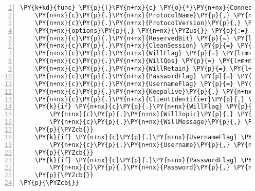 \begin{Verbatim}[commandchars=\\\{\},numbers=left,firstnumber=1,stepnumber=1,frame=single]
\PY{k+kd}{func} \PY{p}{(}\PY{n+nx}{c} \PY{o}{*}\PY{n+nx}{ConnectPacket}\PY{p}{)} \PY{n+nx}{Unpack}\PY{p}{(}\PY{n+nx}{b} \PY{n+nx}{io}\PY{p}{.}\PY{n+nx}{Reader}\PY{p}{)} \PY{p}{\PYZob{}}
	\PY{n+nx}{c}\PY{p}{.}\PY{n+nx}{ProtocolName}\PY{p}{,} \PY{n+nx}{\PYZus{}} \PY{p}{=} \PY{n+nx}{decodeString}\PY{p}{(}\PY{n+nx}{b}\PY{p}{)}
	\PY{n+nx}{c}\PY{p}{.}\PY{n+nx}{ProtocolVersion}\PY{p}{,} \PY{n+nx}{\PYZus{}} \PY{p}{=} \PY{n+nx}{decodeByte}\PY{p}{(}\PY{n+nx}{b}\PY{p}{)}
	\PY{n+nx}{options}\PY{p}{,} \PY{n+nx}{\PYZus{}} \PY{o}{:=} \PY{n+nx}{decodeByte}\PY{p}{(}\PY{n+nx}{b}\PY{p}{)}
	\PY{n+nx}{c}\PY{p}{.}\PY{n+nx}{ReservedBit} \PY{p}{=} \PY{l+m+mi}{1} \PY{o}{\PYZam{}} \PY{n+nx}{options}
	\PY{n+nx}{c}\PY{p}{.}\PY{n+nx}{CleanSession} \PY{p}{=} \PY{l+m+mi}{1} \PY{o}{\PYZam{}} \PY{p}{(}\PY{n+nx}{options} \PY{o}{\PYZgt{}\PYZgt{}} \PY{l+m+mi}{1}\PY{p}{)} \PY{p}{\PYZgt{}} \PY{l+m+mi}{0}
	\PY{n+nx}{c}\PY{p}{.}\PY{n+nx}{WillFlag} \PY{p}{=} \PY{l+m+mi}{1} \PY{o}{\PYZam{}} \PY{p}{(}\PY{n+nx}{options} \PY{o}{\PYZgt{}\PYZgt{}} \PY{l+m+mi}{2}\PY{p}{)} \PY{p}{\PYZgt{}} \PY{l+m+mi}{0}
	\PY{n+nx}{c}\PY{p}{.}\PY{n+nx}{WillQos} \PY{p}{=} \PY{l+m+mi}{3} \PY{o}{\PYZam{}} \PY{p}{(}\PY{n+nx}{options} \PY{o}{\PYZgt{}\PYZgt{}} \PY{l+m+mi}{3}\PY{p}{)}
	\PY{n+nx}{c}\PY{p}{.}\PY{n+nx}{WillRetain} \PY{p}{=} \PY{l+m+mi}{1} \PY{o}{\PYZam{}} \PY{p}{(}\PY{n+nx}{options} \PY{o}{\PYZgt{}\PYZgt{}} \PY{l+m+mi}{5}\PY{p}{)} \PY{p}{\PYZgt{}} \PY{l+m+mi}{0}
	\PY{n+nx}{c}\PY{p}{.}\PY{n+nx}{PasswordFlag} \PY{p}{=} \PY{l+m+mi}{1} \PY{o}{\PYZam{}} \PY{p}{(}\PY{n+nx}{options} \PY{o}{\PYZgt{}\PYZgt{}} \PY{l+m+mi}{6}\PY{p}{)} \PY{p}{\PYZgt{}} \PY{l+m+mi}{0}
	\PY{n+nx}{c}\PY{p}{.}\PY{n+nx}{UsernameFlag} \PY{p}{=} \PY{l+m+mi}{1} \PY{o}{\PYZam{}} \PY{p}{(}\PY{n+nx}{options} \PY{o}{\PYZgt{}\PYZgt{}} \PY{l+m+mi}{7}\PY{p}{)} \PY{p}{\PYZgt{}} \PY{l+m+mi}{0}
	\PY{n+nx}{c}\PY{p}{.}\PY{n+nx}{Keepalive}\PY{p}{,} \PY{n+nx}{\PYZus{}} \PY{p}{=} \PY{n+nx}{decodeUint16}\PY{p}{(}\PY{n+nx}{b}\PY{p}{)}
	\PY{n+nx}{c}\PY{p}{.}\PY{n+nx}{ClientIdentifier}\PY{p}{,} \PY{n+nx}{\PYZus{}} \PY{p}{=} \PY{n+nx}{decodeString}\PY{p}{(}\PY{n+nx}{b}\PY{p}{)}
	\PY{k}{if} \PY{n+nx}{c}\PY{p}{.}\PY{n+nx}{WillFlag} \PY{p}{\PYZob{}}
		\PY{n+nx}{c}\PY{p}{.}\PY{n+nx}{WillTopic}\PY{p}{,} \PY{n+nx}{\PYZus{}} \PY{p}{=} \PY{n+nx}{decodeString}\PY{p}{(}\PY{n+nx}{b}\PY{p}{)}
		\PY{n+nx}{c}\PY{p}{.}\PY{n+nx}{WillMessage}\PY{p}{,} \PY{n+nx}{\PYZus{}} \PY{p}{=} \PY{n+nx}{decodeBytes}\PY{p}{(}\PY{n+nx}{b}\PY{p}{)}
	\PY{p}{\PYZcb{}}
	\PY{k}{if} \PY{n+nx}{c}\PY{p}{.}\PY{n+nx}{UsernameFlag} \PY{p}{\PYZob{}}
		\PY{n+nx}{c}\PY{p}{.}\PY{n+nx}{Username}\PY{p}{,} \PY{n+nx}{\PYZus{}} \PY{p}{=} \PY{n+nx}{decodeString}\PY{p}{(}\PY{n+nx}{b}\PY{p}{)}
	\PY{p}{\PYZcb{}}
	\PY{k}{if} \PY{n+nx}{c}\PY{p}{.}\PY{n+nx}{PasswordFlag} \PY{p}{\PYZob{}}
		\PY{n+nx}{c}\PY{p}{.}\PY{n+nx}{Password}\PY{p}{,} \PY{n+nx}{\PYZus{}} \PY{p}{=} \PY{n+nx}{decodeBytes}\PY{p}{(}\PY{n+nx}{b}\PY{p}{)}
	\PY{p}{\PYZcb{}}
\PY{p}{\PYZcb{}}
\end{Verbatim}

